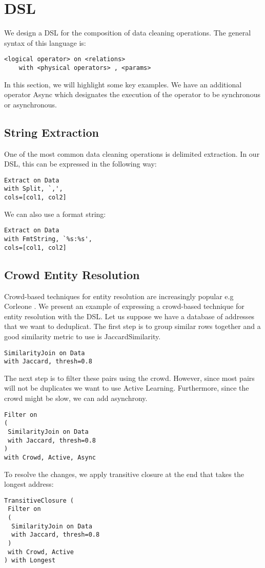 \section{\projx DSL}
We design a DSL for the composition of data cleaning operations.
The general syntax of this language is:
\begin{lstlisting}
<logical operator> on <relations>
	with <physical operators> , <params>
\end{lstlisting}
In this section, we will highlight some key examples.
We have an additional operator \textsf{Async} which designates the 
execution of the operator to be synchronous or asynchronous.

\subsection{String Extraction}
One of the most common data cleaning operations is delimited extraction.
In our DSL, this can be expressed in the following way:
\begin{lstlisting}
Extract on Data
with Split, `,',
cols=[col1, col2]
\end{lstlisting}

We can also use a format string:
\begin{lstlisting}
Extract on Data
with FmtString, `%s:%s',
cols=[col1, col2]
\end{lstlisting}

\subsection{Crowd Entity Resolution}
Crowd-based techniques for entity resolution are increasingly popular e.g Corleone \cite{DBLP:conf/sigmod/GokhaleDDNRSZ14}.
We present an example of expressing a crowd-based technique for entity resolution with the DSL.
Let us suppose we have a database of addresses that we want to deduplicat.
The first step is to group similar rows together and a good similarity metric to use is JaccardSimilarity.
\begin{lstlisting}
SimilarityJoin on Data
with Jaccard, thresh=0.8
\end{lstlisting}
The next step is to filter these pairs using the crowd. 
However, since most pairs will not be duplicates we want to use Active Learning.
Furthermore, since the crowd might be slow, we can add asynchrony.
\begin{lstlisting}
Filter on
( 
 SimilarityJoin on Data
 with Jaccard, thresh=0.8
)
with Crowd, Active, Async
\end{lstlisting}
To resolve the changes, we apply transitive closure at the end that takes the 
longest address:
\begin{lstlisting}
TransitiveClosure (
 Filter on
 ( 
  SimilarityJoin on Data
  with Jaccard, thresh=0.8
 )
 with Crowd, Active
) with Longest
\end{lstlisting}



